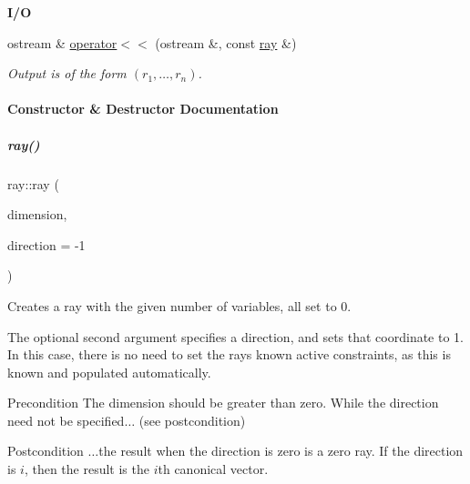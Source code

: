 \begin{Indent}\textbf{ I/O}\par
\begin{DoxyCompactItemize}
\item 
\mbox{\label{group___c_l_s_solvers_a1fa347ed00fc99eec663252c28108a3f}} 
ostream \& \hyperlink{group___c_l_s_solvers_a1fa347ed00fc99eec663252c28108a3f}{operator$<$$<$} (ostream \&, const \hyperlink{group___c_l_s_solvers_classray}{ray} \&)
\begin{DoxyCompactList}\small\item\em Output is of the form $(r_1, \ldots, r_n)$. \end{DoxyCompactList}\end{DoxyCompactItemize}
\end{Indent}


\paragraph{Constructor \& Destructor Documentation}
\mbox{\label{group___c_l_s_solvers_a48d51151bb229b2b3363869760fe4b3c}} 
\subparagraph{\texorpdfstring{ray()}{ray()}\hspace{0.1cm}{\footnotesize\ttfamily [1/5]}}
{\footnotesize\ttfamily ray\+::ray (\begin{DoxyParamCaption}\item[{N\+V\+A\+R\+\_\+\+T\+Y\+PE}]{dimension,  }\item[{long}]{direction = {\ttfamily -\/1} }\end{DoxyParamCaption})}



Creates a ray with the given number of variables, all set to 0. 

The optional second argument specifies a direction, and sets that coordinate to 1. In this case, there is no need to set the ray\textquotesingle{}s known active constraints, as this is known and populated automatically. \begin{DoxyPrecond}{Precondition}
The dimension should be greater than zero. While the direction need not be specified{$\dots$} (see postcondition) 
\end{DoxyPrecond}
\begin{DoxyPostcond}{Postcondition}
{$\dots$}the result when the direction is zero is a zero ray. If the direction is $ i $, then the result is the $i$th canonical vector. 
\end{DoxyPostcond}


